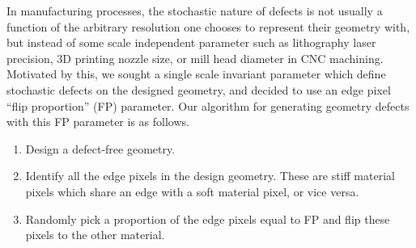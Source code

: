 \documentclass[preprint,review,12pt]{elsarticle}
\begin{document}
In manufacturing processes, the stochastic nature of defects is not usually a function of the arbitrary resolution one chooses to represent their geometry with, but instead of some scale independent parameter such as lithography laser precision, 3D printing nozzle size, or mill head diameter in CNC machining. Motivated by this, we sought a single scale invariant parameter which define stochastic defects on the designed geometry, and decided to use an edge pixel ``flip proportion'' (FP) parameter. Our algorithm for generating geometry defects with this FP parameter is as follows. 
\begin{enumerate}
    \item Design a defect-free geometry. 
    \item Identify all the edge pixels in the design geometry. These are stiff material pixels which share an edge with a soft material pixel, or vice versa.
    \item Randomly pick a proportion of the edge pixels equal to FP and flip these pixels to the other material.
\end{enumerate}

\end{document}
